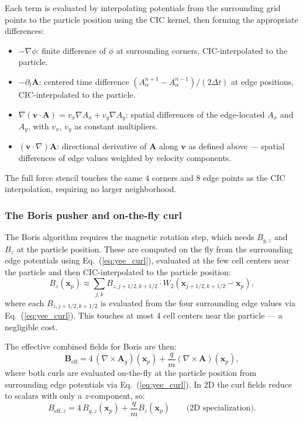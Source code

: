 \documentclass[11pt,a4paper]{article}
\newcommand{\vv}[1]{\mathbf{#1}}
\newcommand{\Ag}{\vv{A}_g}
\begin{document}
Each term is evaluated by interpolating potentials from the surrounding grid points to the particle position using the CIC kernel, then forming the appropriate differences:
\begin{itemize}
  \item $-\nabla\phi$: finite difference of $\phi$ at surrounding corners, CIC-interpolated to the particle.
  \item $-\partial_t\vv{A}$: centered time difference $(A_\alpha^{n+1} - A_\alpha^{n-1})/(2\Delta t)$ at edge positions, CIC-interpolated to the particle.
  \item $\nabla(\vv{v}\cdot\vv{A}) = v_x\nabla A_x + v_y\nabla A_y$: spatial differences of the edge-located $A_x$ and $A_y$, with $v_x$, $v_y$ as constant multipliers.
  \item $(\vv{v}\cdot\nabla)\vv{A}$: directional derivative of $\vv{A}$ along $\vv{v}$ as defined above --- spatial differences of edge values weighted by velocity components.
\end{itemize}
The full force stencil touches the same $4$ corners and $8$ edge points as the CIC interpolation, requiring no larger neighborhood.

\subsubsection*{The Boris pusher and on-the-fly curl}

The Boris algorithm requires the magnetic rotation step, which needs $B_{g,z}$ and $B_z$ at the particle position.  These are computed on the fly from the surrounding edge potentials using Eq.~(\ref{eq:yee_curl}), evaluated at the few cell centers near the particle and then CIC-interpolated to the particle position:
\begin{equation}
  B_{z}(\vv{x}_p) \approx \sum_{j,k} B_{z,j+1/2,k+1/2} \cdot W_2(\vv{x}_{j+1/2,k+1/2} - \vv{x}_p),
\end{equation}
where each $B_{z,j+1/2,k+1/2}$ is evaluated from the four surrounding edge values via Eq.~(\ref{eq:yee_curl}).  This touches at most 4 cell centers near the particle --- a negligible cost.

The effective combined fields for Boris are then:
\begin{equation}
  \vv{B}_{\mathrm{eff}} = 4\,(\nabla\times\Ag)(\vv{x}_p) + \frac{q}{m}(\nabla\times\vv{A})(\vv{x}_p),
\end{equation}
where both curls are evaluated on-the-fly at the particle position from surrounding edge potentials via Eq.~(\ref{eq:yee_curl}).  In 2D the curl fields reduce to scalars with only a $z$-component, so:
\begin{equation}
  B_{\mathrm{eff},z} = 4\,B_{g,z}(\vv{x}_p) + \frac{q}{m}B_z(\vv{x}_p) \qquad\text{(2D specialization).}
\end{equation}
\end{document}
